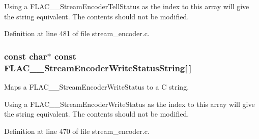 Using a F\+L\+A\+C\+\_\+\+\_\+\+Stream\+Encoder\+Tell\+Status as the index to this array will give the string equivalent. The contents should not be modified. 

Definition at line 481 of file stream\+\_\+encoder.\+c.

\subsubsection[{\texorpdfstring{F\+L\+A\+C\+\_\+\+\_\+\+Stream\+Encoder\+Write\+Status\+String}{FLAC__StreamEncoderWriteStatusString}}]{ {\bf const} char$\ast$ {\bf const} F\+L\+A\+C\+\_\+\+\_\+\+Stream\+Encoder\+Write\+Status\+String\mbox{[}$\,$\mbox{]}}\hypertarget{group__flac__stream__encoder_ga00e6218364ced330f52c625061dfa485}{}\label{group__flac__stream__encoder_ga00e6218364ced330f52c625061dfa485}
Maps a F\+L\+A\+C\+\_\+\+\_\+\+Stream\+Encoder\+Write\+Status to a C string.

Using a F\+L\+A\+C\+\_\+\+\_\+\+Stream\+Encoder\+Write\+Status as the index to this array will give the string equivalent. The contents should not be modified. 

Definition at line 470 of file stream\+\_\+encoder.\+c.

